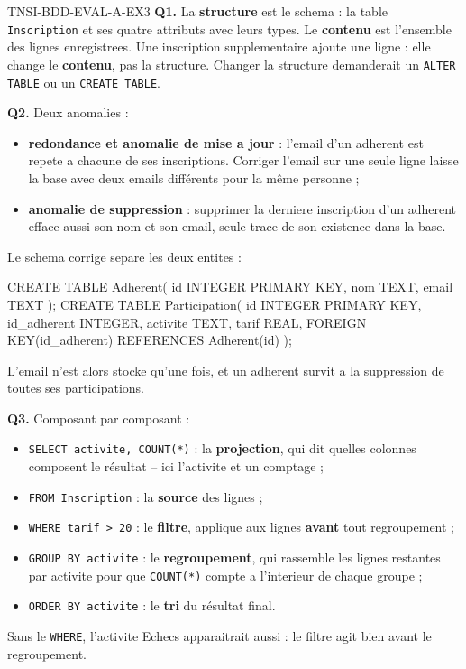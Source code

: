 \begin{corrige}{TNSI-BDD-EVAL-A-EX3}
\textbf{Q1.} La \textbf{structure} est le schema : la table \lstinline{Inscription} et ses
quatre attributs avec leurs types. Le \textbf{contenu} est l'ensemble des lignes
enregistrees. Une inscription supplementaire ajoute une ligne : elle change le
\textbf{contenu}, pas la structure. Changer la structure demanderait un
\lstinline{ALTER TABLE} ou un \lstinline{CREATE TABLE}.

\textbf{Q2.} Deux anomalies :
\begin{itemize}
  \item \textbf{redondance et anomalie de mise a jour} : l'email d'un adherent est repete a
  chacune de ses inscriptions. Corriger l'email sur une seule ligne laisse la base avec deux
  emails différents pour la même personne ;
  \item \textbf{anomalie de suppression} : supprimer la derniere inscription d'un adherent
  efface aussi son nom et son email, seule trace de son existence dans la base.
\end{itemize}
Le schema corrige separe les deux entites :
\begin{sql}
CREATE TABLE Adherent(
  id INTEGER PRIMARY KEY,
  nom TEXT,
  email TEXT
);
CREATE TABLE Participation(
  id INTEGER PRIMARY KEY,
  id_adherent INTEGER,
  activite TEXT,
  tarif REAL,
  FOREIGN KEY(id_adherent) REFERENCES Adherent(id)
);
\end{sql}
L'email n'est alors stocke qu'une fois, et un adherent survit a la suppression de toutes ses
participations.

\textbf{Q3.} Composant par composant :
\begin{itemize}
  \item \lstinline{SELECT activite, COUNT(*)} : la \textbf{projection}, qui dit quelles
  colonnes composent le résultat -- ici l'activite et un comptage ;
  \item \lstinline{FROM Inscription} : la \textbf{source} des lignes ;
  \item \lstinline{WHERE tarif > 20} : le \textbf{filtre}, applique aux lignes
  \textbf{avant} tout regroupement ;
  \item \lstinline{GROUP BY activite} : le \textbf{regroupement}, qui rassemble les lignes
  restantes par activite pour que \lstinline{COUNT(*)} compte a l'interieur de chaque groupe ;
  \item \lstinline{ORDER BY activite} : le \textbf{tri} du résultat final.
\end{itemize}
Sans le \lstinline{WHERE}, l'activite \og Echecs \fg{} apparaitrait aussi : le filtre agit
bien avant le regroupement.
\end{corrige}
